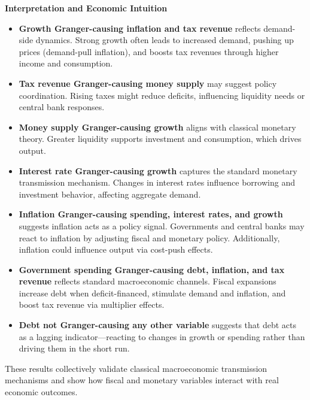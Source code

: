 \documentclass[a4paper,12pt]{article}
\begin{document}
\textbf{Interpretation and Economic Intuition}

\begin{itemize}
  \item \textbf{Growth Granger-causing inflation and tax revenue} reflects demand-side dynamics. Strong growth often leads to increased demand, pushing up prices (demand-pull inflation), and boosts tax revenues through higher income and consumption.
  
  \item \textbf{Tax revenue Granger-causing money supply} may suggest policy coordination. Rising taxes might reduce deficits, influencing liquidity needs or central bank responses.

  \item \textbf{Money supply Granger-causing growth} aligns with classical monetary theory. Greater liquidity supports investment and consumption, which drives output.

  \item \textbf{Interest rate Granger-causing growth} captures the standard monetary transmission mechanism. Changes in interest rates influence borrowing and investment behavior, affecting aggregate demand.

  \item \textbf{Inflation Granger-causing spending, interest rates, and growth} suggests inflation acts as a policy signal. Governments and central banks may react to inflation by adjusting fiscal and monetary policy. Additionally, inflation could influence output via cost-push effects.

  \item \textbf{Government spending Granger-causing debt, inflation, and tax revenue} reflects standard macroeconomic channels. Fiscal expansions increase debt when deficit-financed, stimulate demand and inflation, and boost tax revenue via multiplier effects.

  \item \textbf{Debt not Granger-causing any other variable} suggests that debt acts as a lagging indicator—reacting to changes in growth or spending rather than driving them in the short run.
\end{itemize}

These results collectively validate classical macroeconomic transmission mechanisms and show how fiscal and monetary variables interact with real economic outcomes.

\section{}
\end{document}
